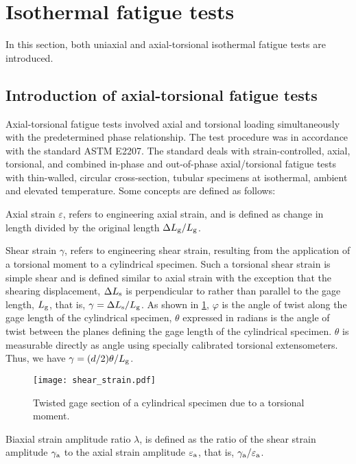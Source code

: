 \section{Isothermal fatigue tests}
\noindent
In this section, both uniaxial and axial-torsional isothermal fatigue tests are introduced.
\subsection{Introduction of axial-torsional fatigue tests}
\noindent
Axial-torsional fatigue tests involved axial and torsional loading simultaneously with the predetermined phase relationship.
The test procedure was in accordance with the standard ASTM E2207.
The standard deals with strain-controlled, axial, torsional, and combined in-phase and out-of-phase axial/torsional fatigue tests with thin-walled, circular cross-section, tubular specimens at isothermal, ambient and elevated temperature.
Some concepts are defined as follows:

Axial strain $\varepsilon$, refers to engineering axial strain, and is defined as change in length divided by the original length $\Delta L_{\rm{g}}/L_{\rm{g}}$.

Shear strain $\gamma$, refers to engineering shear strain, resulting from the application of a torsional moment to a cylindrical specimen.
Such a torsional shear strain is simple shear and is defined similar to axial strain with the exception that the shearing displacement, $\Delta L_{\rm{s}}$ is perpendicular to rather than parallel to the gage length, $L_{\rm{g}}$, that is, $\gamma=\Delta L_{\rm{s}}/L_{\rm{g}}$.
As shown in \ref{Fig:Shear_Strain}, $\varphi$ is the angle of twist along the gage length of the cylindrical specimen, $\theta$ expressed in radians is the angle of twist between the planes defining the gage length of the cylindrical specimen.
$\theta$ is measurable directly as angle using specially calibrated torsional extensometers.
Thus, we have $\gamma = (d/2)\theta/ L_{\rm{g}}$.

\begin{figure}[!htp]
  \centering
  \texttt{[image: shear\_strain.pdf]}
  \caption{Twisted gage section of a cylindrical specimen due to a torsional moment.}
  \label{Fig:Shear_Strain}
\end{figure}

Biaxial strain amplitude ratio $\lambda$, is defined as the ratio of the shear strain amplitude $\gamma_{\rm{a}}$ to the axial strain amplitude $\varepsilon_{\rm{a}}$, that is, $\gamma_{\rm{a}}/\varepsilon_{\rm{a}}$.


